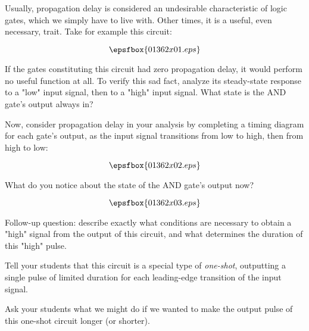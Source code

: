

Usually, propagation delay is considered an undesirable characteristic of logic gates, which we simply have to live with.  Other times, it is a useful, even necessary, trait.  Take for example this circuit:

$$\epsfbox{01362x01.eps}$$

If the gates constituting this circuit had zero propagation delay, it would perform no useful function at all.  To verify this sad fact, analyze its steady-state response to a "low" input signal, then to a "high" input signal.  What state is the AND gate's output always in?

Now, consider propagation delay in your analysis by completing a timing diagram for each gate's output, as the input signal transitions from low to high, then from high to low:

$$\epsfbox{01362x02.eps}$$

What do you notice about the state of the AND gate's output now?







$$\epsfbox{01362x03.eps}$$

\vskip 10pt

Follow-up question: describe exactly what conditions are necessary to obtain a "high" signal from the output of this circuit, and what determines the duration of this "high" pulse.







Tell your students that this circuit is a special type of {\it one-shot}, outputting a single pulse of limited duration for each leading-edge transition of the input signal.

Ask your students what we might do if we wanted to make the output pulse of this one-shot circuit longer (or shorter).




